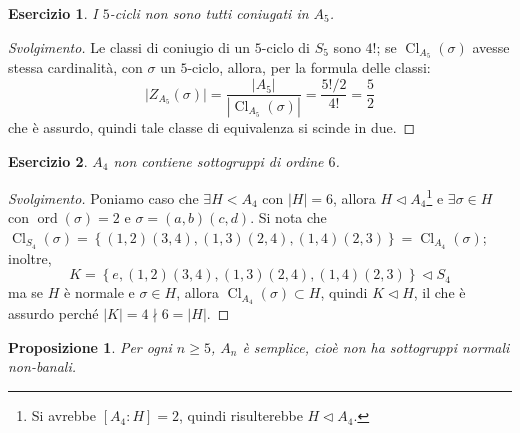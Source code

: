 \documentclass[11pt]{article}
\theoremstyle{style}
\newtheorem{prop}{Proposizione}[section]
\newtheorem{esercizio}{Esercizio}[section]
\newenvironment{svolgimento}{\renewcommand\qedsymbol{$\blacksquare$}\begin{proof}[Svolgimento]}{\end{proof}}
\numberwithin{equation}{subsection}
\begin{document}
\begin{esercizio}
I $5$-cicli non sono tutti coniugati in $A_5$.
\end{esercizio}
\begin{svolgimento}
	Le classi di coniugio di un $5$-ciclo di $S_5$ sono $4!$; se $\operatorname{Cl} _{A_5} (\sigma )$ avesse stessa cardinalit\`a, con $\sigma $ un $5$-ciclo, allora, per la formula delle classi:
	\[
	\lvert Z_{A_5} (\sigma ) \rvert  = \frac{\lvert A_5 \rvert }{|\operatorname{Cl} _{A_5} (\sigma )|}= \frac{5! /2 }{4!} = \frac{5}{2}
	\] 
	che \`e assurdo, quindi tale classe di equivalenza si scinde in due.
\end{svolgimento}
\begin{esercizio}
$A_4$ non contiene sottogruppi di ordine $6$.
\end{esercizio}
\begin{svolgimento}
	Poniamo caso che $\exists H < A_4$ con $|H| = 6$, allora $H \lhd A_4$\footnote{Si avrebbe $[A_4:H] = 2$, quindi risulterebbe $H\lhd A_4$.} e $\exists \sigma  \in H$ con $\operatorname{ord}(\sigma ) =2$ e $\sigma = (a,b)(c,d)$. 
	Si nota che $\operatorname{Cl}_{S_4} (\sigma ) = \left\{ (1,2)(3,4),(1,3)(2,4),(1,4)(2,3) \right\} = \operatorname{Cl} _{A_4} (\sigma )$; inoltre,
\[
K = \left\{e, (1,2)(3,4),(1,3)(2,4),(1,4)(2,3) \right\}\lhd S_4
\] 
	ma se $H$ \`e normale e $\sigma  \in H$, allora $\operatorname{Cl} _{A_4} (\sigma ) \subset H$, quindi $K \lhd H$, il che \`e assurdo perch\'e $\lvert K \rvert =4  \nmid 6 = \lvert H \rvert $.
\end{svolgimento}
\begin{prop}
	Per ogni $n\ge 5$, $A_n$ \`e semplice, cio\`e non ha sottogruppi normali non-banali.
\end{prop}
\end{document}
